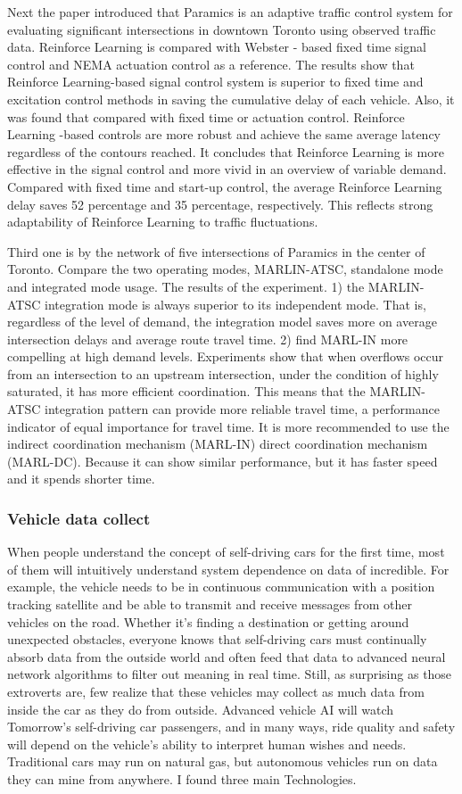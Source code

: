 \documentclass[onecolumn, draftclsnofoot,10pt, compsoc]{IEEEtran}
\begin{document}
Next the paper introduced that Paramics is an adaptive traffic control system for evaluating significant intersections in downtown Toronto using observed traffic data.
Reinforce Learning is compared with Webster - based fixed time signal control and NEMA actuation control as a reference.
The results show that Reinforce Learning-based signal control system is superior to fixed time and excitation control methods in saving the cumulative delay of each vehicle.
Also, it was found that compared with fixed time or actuation control.
Reinforce Learning -based controls are more robust and achieve the same average latency regardless of the contours reached.
It concludes that Reinforce Learning is more effective in the signal control and more vivid in an overview of variable demand.
Compared with fixed time and start-up control, the average Reinforce Learning delay saves 52 percentage and 35 percentage, respectively.
This reflects strong adaptability of Reinforce Learning to traffic fluctuations.

Third one is by the network of five intersections of Paramics in the center of Toronto.
Compare the two operating modes, MARLIN-ATSC, standalone mode and integrated mode usage.
The results of the experiment.
1) the MARLIN-ATSC integration mode is always superior to its independent mode.
That is, regardless of the level of demand, the integration model saves more on average intersection delays and average route travel time.
2) find MARL-IN more compelling at high demand levels.
Experiments show that when overflows occur from an intersection to an upstream intersection, under the condition of highly saturated, it has more efficient coordination.
This means that the MARLIN-ATSC integration pattern can provide more reliable travel time, a performance indicator of equal importance for travel time.
It is more recommended to use the indirect coordination mechanism (MARL-IN) direct coordination mechanism (MARL-DC).
Because it can show similar performance, but it has faster speed and it spends shorter time.
\subsubsection{Vehicle data collect}
When people understand the concept of self-driving cars for the first time, most of them will intuitively understand system dependence on data of incredible.
For example, the vehicle needs to be in continuous communication with a position tracking satellite and be able to transmit and receive messages from other vehicles on the road.
Whether it's finding a destination or getting around unexpected obstacles, everyone knows that self-driving cars must continually absorb data from the outside world and often feed that data to advanced neural network algorithms to filter out meaning in real time.
Still, as surprising as those extroverts are, few realize that these vehicles may collect as much data from inside the car as they do from outside.
Advanced vehicle AI will watch Tomorrow's self-driving car passengers, and in many ways, ride quality and safety will depend on the vehicle's ability to interpret human wishes and needs.
Traditional cars may run on natural gas, but autonomous vehicles run on data they can mine from anywhere.
I found three main Technologies.
\end{document}

